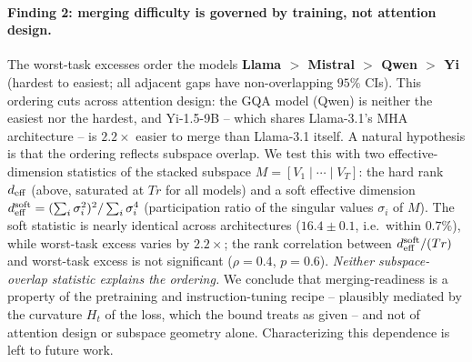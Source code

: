 \paragraph{Finding 2: merging difficulty is governed by training,
not attention design.} The worst-task excesses order the models
\textbf{Llama $>$ Mistral $>$ Qwen $>$ Yi} (hardest to easiest;
all adjacent gaps have non-overlapping $95\%$ CIs). This ordering
cuts across attention design: the GQA model (Qwen) is neither the
easiest nor the hardest, and Yi-1.5-9B -- which shares
Llama-3.1's MHA architecture -- is $2.2\times$ easier to merge
than Llama-3.1 itself. A natural hypothesis is that the ordering
reflects subspace overlap. We test this with two effective-dimension
statistics of the stacked subspace
$M = [V_1 \mid \cdots \mid V_T]$: the hard rank $d_{\mathrm{eff}}$ (above,
saturated at $Tr$ for all models) and a soft effective dimension
$d_{\mathrm{eff}}^{\mathrm{soft}} = (\sum_i \sigma_i^2)^2 / \sum_i \sigma_i^4$
(participation ratio of the singular values $\sigma_i$ of $M$).
The soft statistic is nearly identical across architectures
($16.4 \pm 0.1$, i.e.\ within $0.7\%$), while worst-task excess
varies by $2.2\times$; the rank correlation between
$d_{\mathrm{eff}}^{\mathrm{soft}}/(Tr)$ and worst-task excess is not
significant ($\rho = 0.4$, $p = 0.6$). \emph{Neither
subspace-overlap statistic explains the ordering.} We conclude
that merging-readiness is a property of the pretraining and
instruction-tuning recipe -- plausibly mediated by the curvature
$H_t$ of the loss, which the bound treats as given -- and not of
attention design or subspace geometry alone. Characterizing this
dependence is left to future work.

